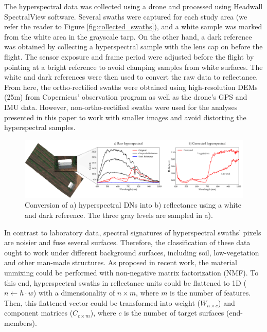 The hyperspectral data was collected using a drone and processed using Headwall SpectralView\texttrademark \hspace{1mm} software. Several swaths were captured for each study area (we refer the reader to Figure \ref{fig:collected_swaths}), and a white sample was marked from the white area in the grayscale tarp. On the other hand, a dark reference was obtained by collecting a hyperspectral sample with the lens cap on before the flight. The sensor exposure and frame period were adjusted before the flight by pointing at a bright reference to avoid clamping samples from white surfaces. The white and dark references were then used to convert the raw data to reflectance. From here, the ortho-rectified swaths were obtained using high-resolution DEMs (25\si{\meter}) from Copernicus' observation program \cite{european_environment_agency_eu_2017} as well as the drone's GPS and IMU data. However, non-ortho-rectified swaths were used for the analyses presented in this paper to work with smaller images and avoid distorting the hyperspectral samples.

\begin{figure}[ht]
    \centering
    \includegraphics[width=\linewidth]{figs/materials/spectral_view_rectification.png}
	\caption{Conversion of a) hyperspectral DNs into b) reflectance using a white and dark reference. The three gray levels are sampled in a). }
	\label{fig:spectral_view_rectification}
\end{figure}

In contrast to laboratory data, spectral signatures of hyperspectral swaths' pixels are noisier and fuse several surfaces. Therefore, the classification of these data ought to work under different background surfaces, including soil, low-vegetation and other man-made structures. As proposed in recent work, the material unmixing could be performed with non-negative matrix factorization (NMF). To this end, hyperspectral swaths in reflectance units could be flattened to 1D ($n \gets h \cdot w$) with a dimensionality of $n \times m$, where $m$ is the number of features. Then, this flattened vector could be transformed into weight ($W_{n \times c}$) and component matrices ($C_{c \times m}$), where $c$ is the number of target surfaces (end-members). 

